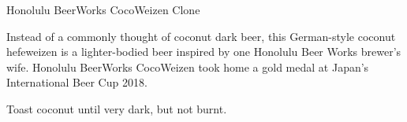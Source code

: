 \begin{recipe}{Honolulu BeerWorks CocoWeizen Clone}

\begin{aboutblock}
Instead of a commonly thought of coconut dark beer, this German-style coconut
hefeweizen is a lighter-bodied beer inspired by one Honolulu Beer Works brewer's wife.
Honolulu BeerWorks CocoWeizen took home a gold medal at Japan's International
Beer Cup 2018. \sourceaha
\end{aboutblock}


\begin{methodandtiming}
 
\begin{mashsteps}
\end{mashsteps}

\begin{fermentationsteps}
\end{fermentationsteps}

\begin{directions}
Toast coconut until very dark, but not burnt.
\end{directions}

\end{methodandtiming}

\recipebreak

\begin{ingredientsblock}

\begin{malts}
\end{malts}

\begin{hops}
\end{hops}


\begin{twists}
\end{twists}

\end{ingredientsblock}

\end{recipe}

